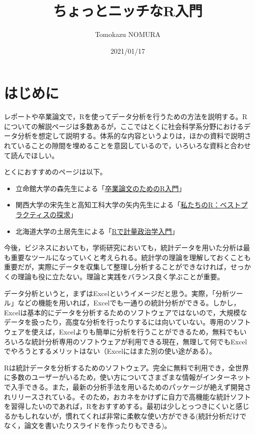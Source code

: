 \documentclass[
]{book}
\title{ちょっとニッチなR入門}
\author{Tomokazu NOMURA}
\date{2021/01/17}
\providecommand{\tightlist}{%
  \setlength{\itemsep}{0pt}\setlength{\parskip}{0pt}}
\begin{document}
\maketitle

{
\setcounter{tocdepth}{1}
\tableofcontents
}
\hypertarget{ux306fux3058ux3081ux306b}{%
\chapter{はじめに}\label{ux306fux3058ux3081ux306b}}

レポートや卒業論文で，Rを使ってデータ分析を行うための方法を説明する。Rについての解説ページは多数あるが，ここではとくに社会科学系分野におけるデータ分析を想定して説明する。体系的な内容というよりは，ほかの資料で説明されていることの隙間を埋めることを意図しているので，いろいろな資料と合わせて読んでほしい。

とくにおすすめのページは以下。

\begin{itemize}
\tightlist
\item
  立命館大学の森先生による「\href{https://tomoecon.github.io/R_for_graduate_thesis/}{卒業論文のためのR入門}」
\item
  関西大学の宋先生と高知工科大学の矢内先生による「\href{https://www.jaysong.net/RBook/}{私たちのR：ベストプラクティスの探求}」
\item
  北海道大学の土居先生による「\href{https://shohei-doi.github.io/quant_polisci/index.html}{Rで計量政治学入門}」
\end{itemize}

今後，ビジネスにおいても，学術研究においても，統計データを用いた分析は最も重要なツールになっていくと考えられる。統計学の理論を理解しておくことも重要だが，実際にデータを収集して整理し分析することができなければ，せっかくの理論も役に立たない。理論と実践をバランス良く学ぶことが重要。

データ分析というと，まずはExcelというイメージだと思う。実際，「分析ツール」などの機能を用いれば，Excelでも一通りの統計分析ができる。しかし，Excelは基本的にデータを分析するためのソフトウェアではないので，大規模なデータを扱ったり，高度な分析を行ったりするには向いていない。専用のソフトウェアを使えば，Excelよりも簡単に分析を行うことができるため，無料でもいろいろな統計分析専用のソフトウェアが利用できる現在，無理して何でもExcelでやろうとするメリットはない（Excelにはまた別の使い途がある）。

Rは統計データを分析するためのソフトウェア。完全に無料で利用でき，全世界に多数のユーザーがいるため，使い方についてさまざまな情報がインターネットで入手できる。また，最新の分析手法を用いるためのパッケージが絶えず開発されリリースされている。そのため，おカネをかけずに自力で高機能な統計ソフトを習得したいのであれば，Rをおすすめする。最初は少しとっつきにくいと感じるかもしれないが，慣れてくれば非常に柔軟な使い方ができる(統計分析だけでなく，論文を書いたりスライドを作ったりもできる)。
\end{document}
